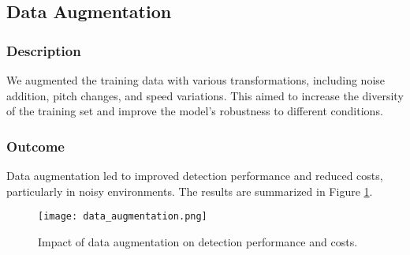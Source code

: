\subsection{Data Augmentation}
\subsubsection{Description}
We augmented the training data with various transformations, including noise addition, pitch changes, and speed variations. This aimed to increase the diversity of the training set and improve the model's robustness to different conditions.

\subsubsection{Outcome}
Data augmentation led to improved detection performance and reduced costs, particularly in noisy environments. The results are summarized in Figure \ref{fig:data_augmentation}.

\begin{figure}[h]
\centering
\texttt{[image: data\_augmentation.png]}
\caption{Impact of data augmentation on detection performance and costs.}
\label{fig:data_augmentation}
\end{figure}
